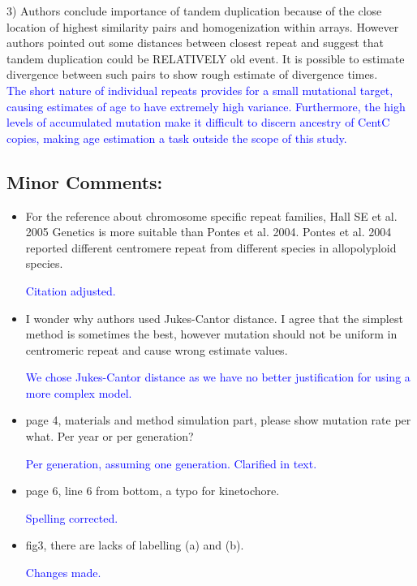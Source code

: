 \documentclass[]{article}
\newcommand{\res}[1]{\noindent \textcolor{blue}{{#1}} \\}
\begin{document}
3) Authors conclude importance of tandem duplication because of the close location of highest similarity pairs and homogenization within arrays. However authors pointed out some distances between closest repeat and suggest that tandem duplication could be RELATIVELY old event. It is possible to estimate divergence between such pairs to show rough estimate of divergence times.\\

\res{The short nature of individual repeats provides for a small mutational target, causing estimates of age to have extremely high variance.  
Furthermore, the high levels of accumulated mutation make it difficult to discern ancestry of CentC copies, making age estimation a task outside the scope of this study.}

\subsection*{Minor Comments:}

\begin{itemize}
\item For the reference about chromosome specific repeat families, Hall SE et al. 2005 Genetics is more suitable than Pontes et al. 2004. Pontes et al. 2004 reported different centromere repeat from different species in allopolyploid species.

\res{Citation adjusted.}

\item I wonder why authors used Jukes-Cantor distance. I agree that the simplest method is sometimes the best, however mutation should not be uniform in centromeric repeat and cause wrong estimate values. 

\res{We chose Jukes-Cantor distance as we have no better justification for using a more complex model.  }

\item page 4, materials and method simulation part, please show mutation rate per what. Per year or per generation? 

\res{Per generation, assuming one generation.  Clarified in text.}

\item page 6, line 6 from bottom, a typo for kinetochore.

\res{Spelling corrected.}

\item fig3, there are lacks of labelling (a) and (b). 

\res{Changes made.}

\end{itemize}
\end{document}

